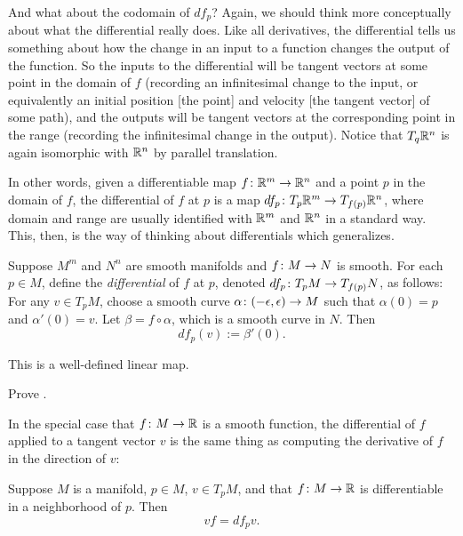And what about the codomain of $df_p$? Again, we should think more conceptually about what the differential really does. Like all derivatives, the differential tells us something about how the change in an input to a function changes the output of the function. So the inputs to the differential will be tangent vectors at some point in the domain of $f$ (recording an infinitesimal change to the input, or equivalently an initial position [the point] and velocity [the tangent vector] of some path), and the outputs will be tangent vectors at the corresponding point in the range (recording the infinitesimal change in the output). Notice that $T_q \mathbb{R}^n$ is again isomorphic with $\mathbb{R}^n$ by parallel translation.

In other words, given a differentiable map $f \colon\thinspace\! \mathbb{R}^m \to \mathbb{R}^n$ and a point $p$ in the domain of $f$, the differential of $f$ at $p$ is a map $df_p \colon\thinspace\! T_p \mathbb{R}^m \to T_{f(p)}\mathbb{R}^n$, where domain and range are usually identified with $\mathbb{R}^m$ and $\mathbb{R}^n$ in a standard way. This, then, is the way of thinking about differentials which generalizes.

\begin{definition}\label{def:differential}
	Suppose $M^m$ and $N^n$ are smooth manifolds and $f \colon\thinspace\! M \to N$ is smooth. For each $p \in M$, define the \emph{differential} of $f$ at $p$, denoted $df_p\colon\thinspace\! T_p M \to T_{f(p)}N$, as follows: For any $v \in T_p M$, choose a smooth curve $\alpha \colon\thinspace\! (-\epsilon, \epsilon) \to M$ such that $\alpha(0) = p$ and $\alpha'(0) = v$. Let $\beta = f \circ \alpha$, which is a smooth curve in $N$. Then
	\[
		df_p(v) := \beta'(0).
	\]
\end{definition}

\begin{lemma}\label{lem:differential is well defined}
	This is a well-defined linear map.
\end{lemma}

\begin{exercise}
	Prove .
\end{exercise}

In the special case that $f\colon\thinspace\! M \to \mathbb{R}$ is a smooth function, the differential of $f$ applied to a tangent vector $v$ is the same thing as computing the derivative of $f$ in the direction of $v$:

\begin{lemma}\label{lem:vector fields and differentials}
	Suppose $M$ is a manifold, $p \in M$, $v \in T_pM$, and that $f\colon\thinspace\! M \to \mathbb{R}$ is differentiable in a neighborhood of $p$. Then
	\[
		vf = df_p v.
	\]
\end{lemma}

